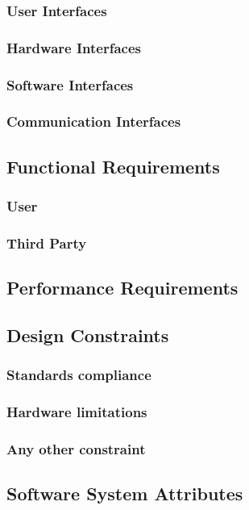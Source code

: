 \documentclass[12pt]{article}
\begin{document}
        \subsubsection{User Interfaces}
        \subsubsection{Hardware Interfaces}
        \subsubsection{Software Interfaces}
        \subsubsection{Communication Interfaces}
    \subsection{Functional Requirements}
        \subsubsection{User}
            
        \subsubsection{Third Party}
    \subsection{Performance Requirements}
    \subsection{Design Constraints}
        \subsubsection{Standards compliance}
        \subsubsection{Hardware limitations}
        \subsubsection{Any other constraint}
    \subsection{Software System Attributes}
\end{document}
